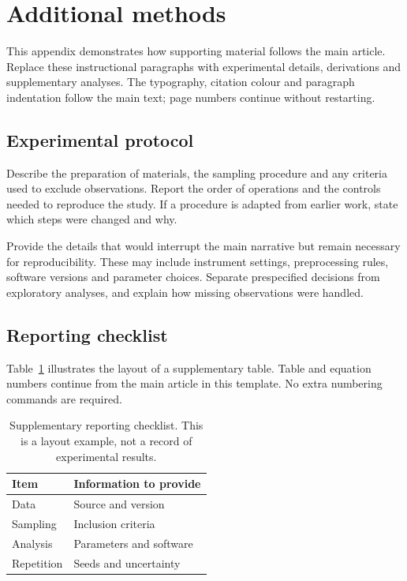 
\section{Additional methods}
\label{app:methods}
This appendix demonstrates how supporting material follows the main article.
Replace these instructional paragraphs with experimental details, derivations
and supplementary analyses. The typography, citation colour and paragraph
indentation follow the main text; page numbers continue without restarting.

\subsection{Experimental protocol}
\label{app:protocol}
Describe the preparation of materials, the sampling procedure and any criteria
used to exclude observations. Report the order of operations and the controls
needed to reproduce the study. If a procedure is adapted from earlier work,
state which steps were changed and why.

Provide the details that would interrupt the main narrative but remain necessary
for reproducibility. These may include instrument settings, preprocessing rules,
software versions and parameter choices. Separate prespecified decisions from
exploratory analyses, and explain how missing observations were handled.

\subsection{Reporting checklist}
Table~\ref{tab:supplement} illustrates the layout of a supplementary table.
Table and equation numbers continue from the main article in this template.
No extra numbering commands are required.

\begin{table}[htbp]
  \centering\small
  \caption{Supplementary reporting checklist. This is a layout example,
    not a record of experimental results.}
  \label{tab:supplement}
  \begin{tabular*}{\linewidth}{@{\extracolsep{\fill}}ll@{}}
    \toprule
    Item & Information to provide \\
    \midrule
    Data & Source and version \\
    Sampling & Inclusion criteria \\
    Analysis & Parameters and software \\
    Repetition & Seeds and uncertainty \\
    \bottomrule
  \end{tabular*}
\end{table}

